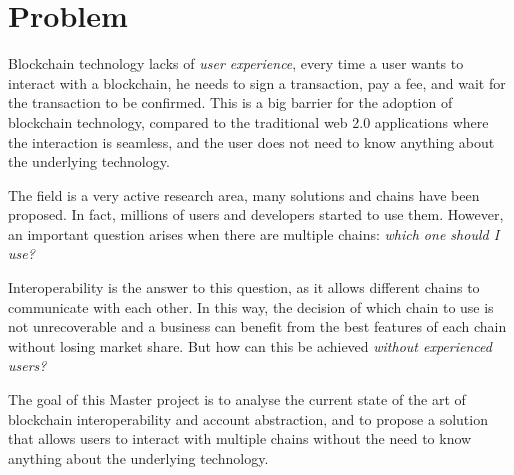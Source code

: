 \chapter{Problem}
\label{chap:problem}

Blockchain technology lacks of \textit{user experience}, every time a user wants to interact with a blockchain, he needs to sign a transaction, pay a fee, and wait for the transaction to be confirmed. This is a big barrier for the adoption of blockchain technology, compared to the traditional web 2.0 applications where the interaction is seamless, and the user does not need to know anything about the underlying technology. 

The field is a very active research area, many solutions and chains have been proposed. In fact, millions of users and developers started to use them. \cite{blockchain-statistics} However, an important question arises when there are multiple chains: \textit{which one should I use?}

Interoperability is the answer to this question, as it allows different chains to communicate with each other. In this way, the decision of which chain to use is not unrecoverable and a business can benefit from the best features of each chain without losing market share. But how can this be achieved \textit{without experienced users?}

The goal of this Master project is to analyse the current state of the art of blockchain interoperability and account abstraction, and to propose a solution that allows users to interact with multiple chains without the need to know anything about the underlying technology. 